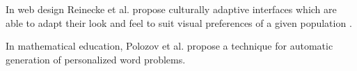 In web design Reinecke et al. propose culturally adaptive interfaces which are able to adapt their look and feel to suit visual preferences of a given population \cite{Reinecke13-CulturalAdaptation}. 

In mathematical education, Polozov et al. propose a technique for automatic generation of personalized word problems\cite{Polozov15-AdaptableMath}.










